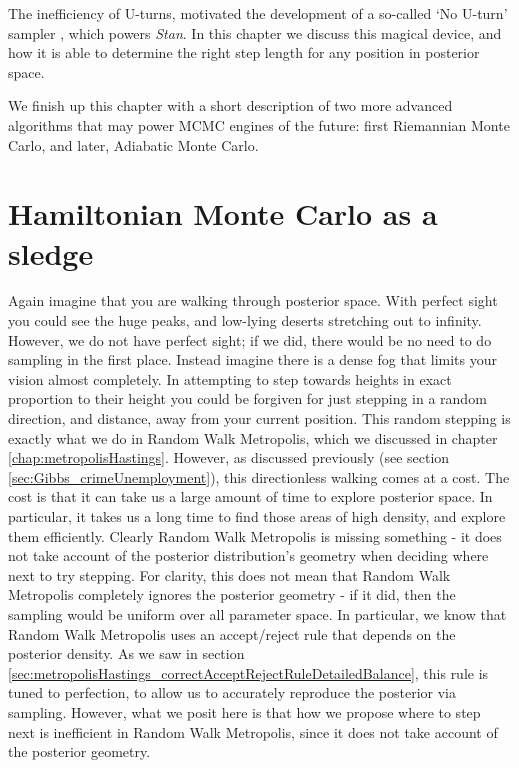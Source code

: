 \documentclass[11pt,fullpage]{book}
\begin{document}
The inefficiency of U-turns, motivated the development of a so-called `No U-turn' sampler \cite{homan2014no}, which powers \textit{Stan}. In this chapter we discuss this magical device, and how it is able to determine the right step length for any position in posterior space.

We finish up this chapter with a short description of two more advanced algorithms that may power MCMC engines of the future: first Riemannian Monte Carlo, and later, Adiabatic Monte Carlo. 

\section{Hamiltonian Monte Carlo as a sledge}
Again imagine that you are walking through posterior space. With perfect sight you could see the huge peaks, and low-lying deserts stretching out to infinity. However, we do not have perfect sight; if we did, there would be no need to do sampling in the first place. Instead imagine there is a dense fog that limits your vision almost completely. In attempting to step towards heights in exact proportion to their height you could be forgiven for just stepping in a random direction, and distance, away from your current position. This random stepping is exactly what we do in Random Walk Metropolis, which we discussed in chapter \ref{chap:metropolisHastings}. However, as discussed previously (see section \ref{sec:Gibbs_crimeUnemployment}), this directionless walking comes at a cost. The cost is that it can take us a large amount of time to explore posterior space. In particular, it takes us a long time to find those areas of high density, and explore them efficiently. Clearly Random Walk Metropolis is missing something - it does not take account of the posterior distribution's geometry when deciding where next to try stepping. For clarity, this does not mean that Random Walk Metropolis completely ignores the posterior geometry - if it did, then the sampling would be uniform over all parameter space. In particular, we know that Random Walk Metropolis uses an accept/reject rule that depends on the posterior density. As we saw in section \ref{sec:metropolisHastings_correctAcceptRejectRuleDetailedBalance}, this rule is tuned to perfection, to allow us to accurately reproduce the posterior via sampling. However, what we posit here is that how we propose where to step next is inefficient in Random Walk Metropolis, since it does not take account of the posterior geometry.
\end{document}
